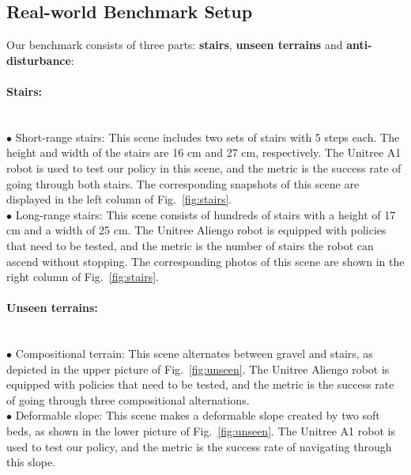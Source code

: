 \subsection{Real-world Benchmark Setup}
\label{app:real}
Our benchmark consists of three parts: \textbf{stairs}, \textbf{unseen terrains} and \textbf{anti-disturbance}:

\paragraph{Stairs:} \\
$\bullet$ Short-range stairs: This scene includes two sets of stairs with 5 steps each. The height and width of the stairs are 16 cm and 27 cm, respectively. The Unitree A1 robot is used to test our policy in this scene, and the metric is the success rate of going through both stairs. The corresponding snapshots of this scene are displayed in the left column of Fig.~\ref{fig:stairs}. \\
$\bullet$ Long-range stairs: This scene consists of hundreds of stairs with a height of 17 cm and a width of 25 cm. The Unitree Aliengo robot is equipped with policies that need to be tested, and the metric is the number of stairs the robot can ascend without stopping. The corresponding photos of this scene are shown in the right column of Fig.~\ref{fig:stairs}. \\

\paragraph{Unseen terrains:} \\
$\bullet$ Compositional terrain: This scene alternates between gravel and stairs, as depicted in the upper picture of Fig.~\ref{fig:unseen}. The Unitree Aliengo robot is equipped with policies that need to be tested, and the metric is the success rate of going through three compositional alternations. \\
$\bullet$ Deformable slope: This scene makes a deformable slope created by two soft beds, as shown in the lower picture of Fig.~\ref{fig:unseen}. The Unitree A1 robot is used to test our policy, and the metric is the success rate of navigating through this slope. \\

